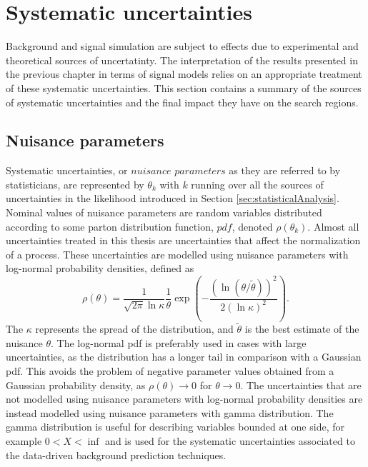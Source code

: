 \chapter{Systematic uncertainties}
\noindent
\justify
Background and signal simulation are subject to effects due to experimental and theoretical sources of uncertatinty.
The interpretation of the results presented in the previous chapter in terms of signal models relies on an appropriate treatment of these systematic uncertainties. 
This section contains a summary of the sources of systematic uncertainties and the final impact they have on the search regions.
\newpage
\section{Nuisance parameters}
\noindent
\justify
Systematic uncertainties, or $nuisance$ $parameters$ as they are referred to by statisticians, are represented by $\theta_{k}$ with $k$ running over all the sources of uncertainties \cite{Lista:2016chp} in the likelihood introduced in Section \ref{sec:statisticalAnalysis}.                                         
Nominal values of nuisance parameters are random variables distributed according to some parton distribution function, $pdf$, denoted $\rho(\theta_{k})$. 
Almost all uncertainties treated in this thesis are uncertainties that affect the normalization of a process. 
These uncertainties are modelled using nuisance parameters with log-normal probability densities, defined as
\begin{equation}
\rho(\theta)=\frac{1}{\sqrt{2\pi}\ln \kappa }\frac{1}{\theta}\exp\left(-\frac{(\ln(\theta/\tilde{\theta}))^{2}}{2(\ln \kappa)^{2}}\right).
\end{equation}   
The $\kappa$ represents the spread of the distribution, and $\tilde{\theta}$ is the best estimate of the nuisance $\theta$. 
The log-normal pdf is preferably used in cases with large uncertainties, as the distribution has a longer tail in comparison with a Gaussian pdf. 
This avoids the problem of negative parameter values obtained from a Gaussian probability density, as $\rho(\theta)\rightarrow0$ for $\theta\rightarrow0$.
The uncertainties that are not modelled using nuisance parameters with log-normal probability densities are instead modelled using nuisance parameters with gamma distribution.
The gamma distribution is useful for describing variables bounded at one side, for example $0<X<\inf$ and is used for the systematic uncertainties associated to the data-driven background prediction techniques. 
